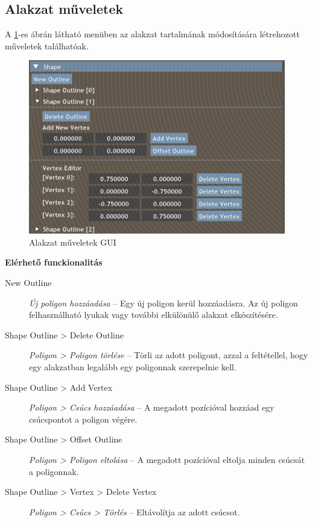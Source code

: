 \subsection{Alakzat műveletek}

A \ref{fig:shape_actions-1}-es ábrán látható menüben az alakzat tartalmának módosítására létrehozott műveletek találhatóak.

\begin{figure}[H]
    \centering
    \includegraphics[width=0.85\linewidth]{images/shape_actions.png}
    \caption{Alakzat műveletek GUI}
    \label{fig:shape_actions-1}
\end{figure}

\textbf{Elérhető funckionalitás}

\begin{description}
    \item[New Outline] \textit{Új poligon hozzáadása} -- Egy új poligon kerül hozzáadásra. Az új poligon felhasználható lyukak vagy további elkülönülő alakzat elkészítésére.
    \item[Shape Outline > Delete Outline] \textit{Poligon > Poligon törlése} -- Törli az adott poligont, azzal a feltétellel, hogy egy alakzatban legalább egy poligonnak szerepelnie kell.
    \item[Shape Outline > Add Vertex] \textit{Poligon > Csúcs hozzáadása} -- A megadott pozícióval hozzáad egy csúcspontot a poligon végére.
    \item[Shape Outline > Offset Outline] \textit{Poligon > Poligon eltolása} -- A megadott pozícióval eltolja minden csúcsát a poligonnak.
    \item[Shape Outline > Vertex > Delete Vertex] \textit{Poligon > Csúcs > Törlés} -- Eltávolítja az adott csúcsot.
\end{description}

